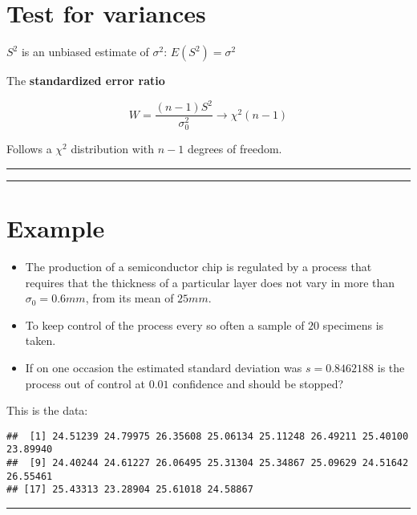 \documentclass[
]{book}
\begin{document}
\hypertarget{test-for-variances-3}{%
\section{Test for variances}\label{test-for-variances-3}}

\(S^2\) is an unbiased estimate of \(\sigma^2\): \(E(S^2)=\sigma^2\)

The \textbf{standardized error ratio}

\[W=\frac{(n-1)S^2}{\sigma_0^2} \rightarrow \chi^2(n-1)\]

Follows a \(\chi^2\) distribution with \(n-1\) degrees of freedom.

\begin{center}\rule{0.5\linewidth}{0.5pt}\end{center}

\begin{center}\rule{0.5\linewidth}{0.5pt}\end{center}

\hypertarget{example-20}{%
\section{Example}\label{example-20}}

\begin{itemize}
\item
  The production of a semiconductor chip is regulated by a process that requires that the thickness of a particular layer does not vary in more than \(\sigma_0=0.6mm\), from its mean of \(25mm\).
\item
  To keep control of the process every so often a sample of \(20\) specimens is taken.
\item
  If on one occasion the estimated standard deviation was \(s=0.8462188\) is the process out of control at \(0.01\) confidence and should be stopped?
\end{itemize}

This is the data:

\begin{verbatim}
##  [1] 24.51239 24.79975 26.35608 25.06134 25.11248 26.49211 25.40100 23.89940
##  [9] 24.40244 24.61227 26.06495 25.31304 25.34867 25.09629 24.51642 26.55461
## [17] 25.43313 23.28904 25.61018 24.58867
\end{verbatim}

\begin{center}\rule{0.5\linewidth}{0.5pt}\end{center}
\end{document}
